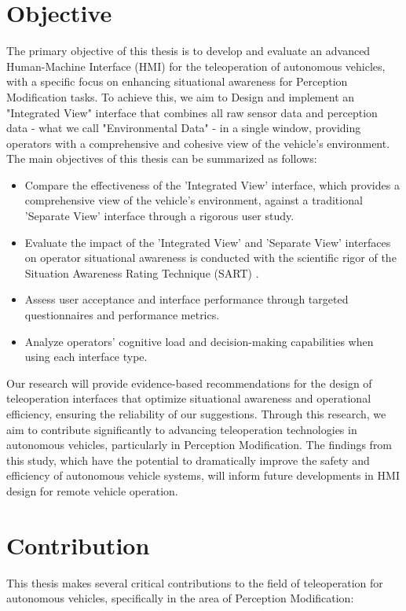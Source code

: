 \section{Objective}
The primary objective of this thesis is to develop and evaluate an advanced Human-Machine Interface (HMI) for the teleoperation of autonomous vehicles, with a specific focus on enhancing situational awareness for Perception Modification tasks. To achieve this, we aim to Design and implement an "Integrated View" interface that combines all raw sensor data and perception data - what we call "Environmental Data" - in a single window, providing operators with a comprehensive and cohesive view of the vehicle's environment. The main objectives of this thesis can be summarized as follows:
\begin{itemize}
    \item Compare the effectiveness of the 'Integrated View' interface, which provides a comprehensive view of the vehicle's environment, against a traditional 'Separate View' interface through a rigorous user study.
    \item Evaluate the impact of the 'Integrated View' and 'Separate View' interfaces on operator situational awareness is conducted with the scientific rigor of the Situation Awareness Rating Technique (SART) \cite{taylor1990sart}.
    \item Assess user acceptance and interface performance through targeted questionnaires and performance metrics.
    \item Analyze operators' cognitive load and decision-making capabilities when using each interface type.
\end{itemize}
Our research will provide evidence-based recommendations for the design of teleoperation interfaces that optimize situational awareness and operational efficiency, ensuring the reliability of our suggestions. Through this research, we aim to contribute significantly to advancing teleoperation technologies in autonomous vehicles, particularly in Perception Modification. The findings from this study, which have the potential to dramatically improve the safety and efficiency of autonomous vehicle systems, will inform future developments in HMI design for remote vehicle operation.
\section{Contribution}
This thesis makes several critical contributions to the field of teleoperation for autonomous
vehicles, specifically in the area of Perception Modification:

